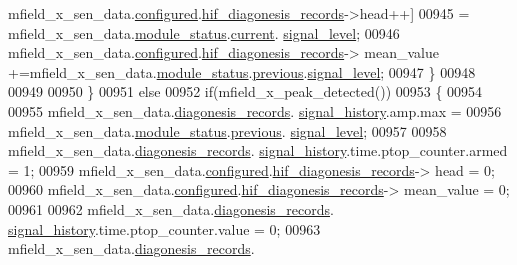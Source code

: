 \begin{DoxyCode}
{{      mfield\_x\_sen\_data.\hyperlink{a00025_a94b2d1f6ea4ab334c74d24984dd27843}{configured}.\hyperlink{a00021_ae18294f7499d9fcb5ec796a1816b8cd8}{hif\_diagonesis\_records}->head++]
00945                = mfield\_x\_sen\_data.\hyperlink{a00025_adfab5a5d8b45a93dfb13edb24e2b80e3}{module\_status}.\hyperlink{a00019_acf41ffc11da291c2f9f0fcb02ee72b98}{current}.
      \hyperlink{a00019_a4070db8eab0ff93e3fbc1df59872f117}{signal\_level};
00946                mfield\_x\_sen\_data.\hyperlink{a00025_a94b2d1f6ea4ab334c74d24984dd27843}{configured}.\hyperlink{a00021_ae18294f7499d9fcb5ec796a1816b8cd8}{hif\_diagonesis\_records}->
      mean\_value +=mfield\_x\_sen\_data.\hyperlink{a00025_adfab5a5d8b45a93dfb13edb24e2b80e3}{module\_status}.\hyperlink{a00019_adcb859b2f3983a9c58deab28e59c333f}{previous}.\hyperlink{a00019_a4070db8eab0ff93e3fbc1df59872f117}{signal\_level};
00947                \}
00948 
00949 
00950          \}
00951          \textcolor{keywordflow}{else}
00952          \textcolor{keywordflow}{if}(mfield\_x\_peak\_detected())
00953          \{
00954 
00955                   mfield\_x\_sen\_data.\hyperlink{a00025_a2bd79ce84bbd6b7f50d38954f7ae475e}{diagonesis\_records}.
      \hyperlink{a00019_ab7038f4de1f77b52a7f89e9f77c0b846}{signal\_history}.amp.max  =
00956                          mfield\_x\_sen\_data.\hyperlink{a00025_adfab5a5d8b45a93dfb13edb24e2b80e3}{module\_status}.\hyperlink{a00019_adcb859b2f3983a9c58deab28e59c333f}{previous}.
      \hyperlink{a00019_a4070db8eab0ff93e3fbc1df59872f117}{signal\_level};
00957 
00958                    mfield\_x\_sen\_data.\hyperlink{a00025_a2bd79ce84bbd6b7f50d38954f7ae475e}{diagonesis\_records}.
      \hyperlink{a00019_ab7038f4de1f77b52a7f89e9f77c0b846}{signal\_history}.time.ptop\_counter.armed              = 1;
00959                    mfield\_x\_sen\_data.\hyperlink{a00025_a94b2d1f6ea4ab334c74d24984dd27843}{configured}.\hyperlink{a00021_ae18294f7499d9fcb5ec796a1816b8cd8}{hif\_diagonesis\_records}->
      head                                = 0;
00960                    mfield\_x\_sen\_data.\hyperlink{a00025_a94b2d1f6ea4ab334c74d24984dd27843}{configured}.\hyperlink{a00021_ae18294f7499d9fcb5ec796a1816b8cd8}{hif\_diagonesis\_records}->
      mean\_value                          = 0;
00961 
00962                    mfield\_x\_sen\_data.\hyperlink{a00025_a2bd79ce84bbd6b7f50d38954f7ae475e}{diagonesis\_records}.
      \hyperlink{a00019_ab7038f4de1f77b52a7f89e9f77c0b846}{signal\_history}.time.ptop\_counter.value              = 0;
00963                    mfield\_x\_sen\_data.\hyperlink{a00025_a2bd79ce84bbd6b7f50d38954f7ae475e}{diagonesis\_records}.
}}
\end{DoxyCode}
